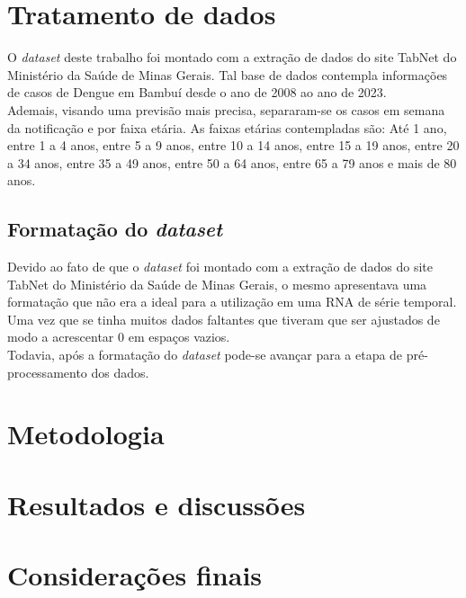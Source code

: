 \documentclass[
	article,			%
	12pt,				%
	a4paper,			%
	chapter=TITLE,		%
	section=TITLE,		%
	subsection=TITLE,	%
	subsubsection=TITLE %
	english,			%
	brazil,				%
	sumario=tradicional
	]{abntex2}
\begin{document}
\section{Tratamento de dados}
O \textit{dataset} deste trabalho foi montado com a extração de dados do site TabNet do Ministério da Saúde de Minas Gerais. Tal base de dados contempla informações de casos de Dengue em Bambuí desde o ano de 2008 ao ano de 2023. 
\\ \indent Ademais, visando uma previsão mais precisa, separaram-se os casos em semana da notificação e por faixa etária. 
As faixas etárias contempladas são: Até 1 ano, entre 1 a 4 anos, entre 5 a 9 anos, entre 10 a 14 anos, entre 15 a 19 anos, entre 20 a 34 anos, entre 35 a 49 anos, entre 50 a 64 anos, entre 65 a 79 anos e mais de 80 anos.
\subsection{Formatação do \textit{dataset}}
Devido ao fato de que o \textit{dataset} foi montado com a extração de dados do site TabNet do Ministério da Saúde de Minas Gerais, o mesmo apresentava uma formatação que não era a ideal para a utilização em uma RNA de série temporal. Uma vez que se tinha muitos dados faltantes que tiveram que ser ajustados de modo a acrescentar 0 em espaços vazios.
\\ \indent
Todavia, após a formatação do \textit{dataset} pode-se avançar para a etapa de pré-processamento dos dados.


\section{Metodologia}

\section{Resultados e discussões}

 
\section{Considerações finais}



\begin{citacao}

\end{citacao}
\end{document}
